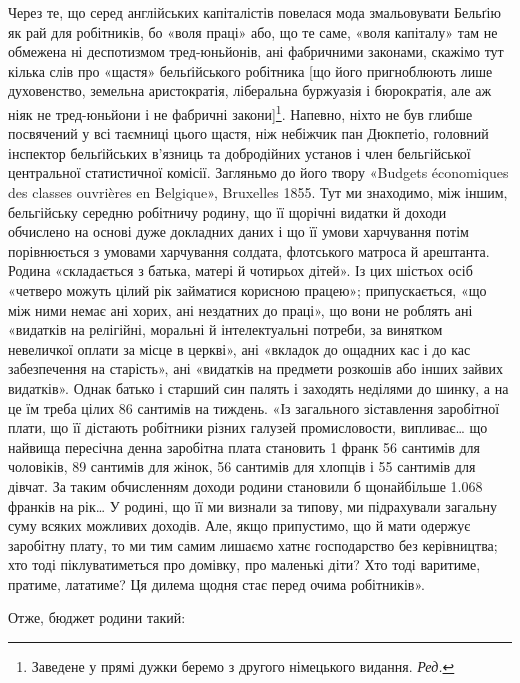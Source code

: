 
Через те, що серед англійських капіталістів повелася мода
змальовувати Бельґію як рай для робітників, бо «воля праці»
або, що те саме, «воля капіталу» там не обмежена ні деспотизмом
тред-юньйонів, ані фабричними законами, скажімо тут кілька
слів про «щастя» бельґійського робітника [що його пригноблюють
лише духовенство, земельна аристократія, ліберальна буржуазія
і бюрократія, але аж ніяк не тред-юньйони і не фабричні закони]\footnote*{
Заведене у прямі дужки беремо з другого німецького видання. \emph{Ред.}
}.
Напевно, ніхто не був глибше посвячений у всі таємниці
цього щастя, ніж небіжчик пан Дюкпетіо, головний інспектор
бельґійських в’язниць та добродійних установ і член бельгійської
центральної статистичної комісії. Загляньмо до його твору
«Budgets économiques des classes ouvrières en Belgique», Bruxelles
1855. Тут ми знаходимо, між іншим, бельгійську середню
робітничу родину, що її щорічні видатки й доходи обчислено
на основі дуже докладних даних і що її умови харчування потім
порівнюється з умовами харчування солдата, флотського матроса
й арештанта. Родина «складається з батька, матері й чотирьох
дітей». Із цих шістьох осіб «четверо можуть цілий рік займатися
корисною працею»; припускається, «що між ними немає ані
хорих, ані нездатних до праці», що вони не роблять ані «видатків
на релігійні, моральні й інтелектуальні потреби, за винятком
невеличкої оплати за місце в церкві», ані «вкладок до ощадних
кас і до кас забезпечення на старість», ані «видатків на предмети
розкошів або інших зайвих видатків». Однак батько і старший
син палять і заходять неділями до шинку, а на це їм треба цілих
86 сантимів на тиждень. «Із загального зіставлення заробітної
плати, що її дістають робітники різних галузей промисловости,
випливає\dots{} що найвища пересічна денна заробітна плата становить
1 франк 56 сантимів для чоловіків, 89 сантимів для жінок,
56 сантимів для хлопців і 55 сантимів для дівчат. За таким обчисленням
доходи родини становили б щонайбільше \num{1.068} франків
на рік\dots{} У родині, що її ми визнали за типову, ми підрахували
загальну суму всяких можливих доходів. Але, якщо припустимо,
що й мати одержує заробітну плату, то ми тим самим
лишаємо хатнє господарство без керівництва; хто тоді піклуватиметься
про домівку, про маленькі діти? Хто тоді варитиме, пратиме,
лататиме? Ця дилема щодня стає перед очима робітників».

Отже, бюджет родини такий:

